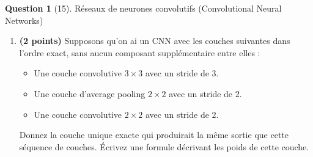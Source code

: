 \documentclass[12pt]{article}
\theoremstyle{definition}
\newtheorem{exercise}{Question}%
\begin{document}
\begin{exercise}[15]{
\label{ex:convolutional-neural-networks}
Réseaux de neurones convolutifs (Convolutional Neural Networks)
\begin{enumerate}
\item \textbf{(2 points)} Supposons qu'on ai un CNN avec les couches suivantes dans l'ordre exact, sans aucun composant supplémentaire entre elles :
\begin{itemize}
    \item Une couche convolutive $3\times 3$ avec un stride de $3$.
    \item Une couche d'average pooling $2\times 2$ avec un stride de $2$.
    \item Une couche convolutive $2\times 2$ avec un stride de $2$.
\end{itemize}
Donnez la couche unique exacte qui produirait la même sortie que cette séquence de couches. Écrivez une formule décrivant les poids de cette couche.


\end{enumerate}}
\end{exercise}
\end{document}
